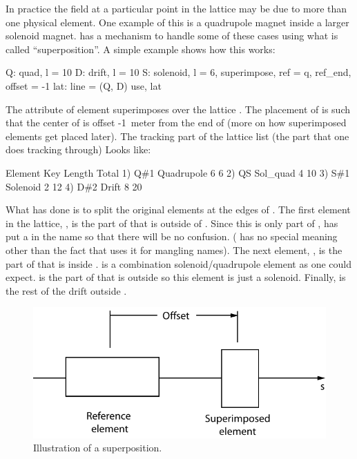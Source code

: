 In practice the field at a particular point in the lattice may be due
to more than one physical element. One example of this is a quadrupole
magnet inside a larger solenoid magnet. \bmad has a mechanism to
handle some of these cases using what is called ``superposition''. A
simple example shows how this works:
\begin{example}
  Q: quad, l = 10
  D: drift, l = 10
  S: solenoid, l = 6, superimpose, ref = q, ref_end, offset = -1
  lat: line = (Q, D)
  use, lat
\end{example}
The  attribute of element  superimposes 
over the lattice . The placement of  is such that the
center of  is offset -1~meter from the end of  (more on how
superimposed elements get placed later). The tracking part of the
lattice list (the part that one does tracking through) Looks like:
\begin{example}
        Element   Key         Length  Total     
  1)    Q{\#}1       Quadrupole   6        6
  2)    Q{\B}S       Sol_quad     4       10
  3)    S{\#}1       Solenoid     2       12
  4)    D{\#}2       Drift        8       20
\end{example}
What \bmad has done is to split the original elements  at
the edges of . The first element in the lattice, , is
the part of  that is outside of . Since this is only part
of , \bmad has put a  in the name so that there will be
no confusion. (\vn{\#} has no special meaning other than the fact
that \bmad uses it for mangling names). The next element, ,
is the part of  that is inside .  is a
combination solenoid/quadrupole element as one could
expect.  is the part of  that is outside  so
this element is just a solenoid. Finally,  is the rest of the
drift outside .

\begin{figure}[tb]
\centering 
\includegraphics{superimpose.pdf} 
\caption[Superposition Illustration.]
{Illustration of a superposition.}
\label{f:superimpose}
\end{figure}

